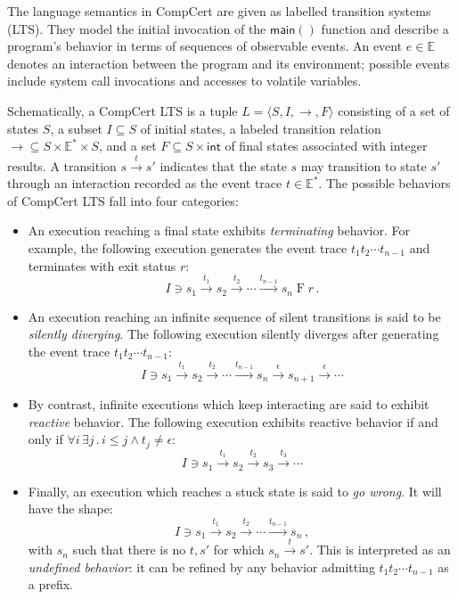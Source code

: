 \documentclass[sigplan,10pt,review,anonymous]{acmart}
\newcommand{\kw}[1]{\ensuremath{ \mathsf{#1} }}
\begin{document}
The language semantics in CompCert are
given as labelled transition systems (LTS).
They model the initial invocation of the \kw{main()} function
and describe a program's behavior in terms of
sequences of observable events.
An event $e \in \mathbb{E}$ denotes an interaction between
the program and its environment;
possible events include system call invocations
and accesses to volatile variables.

Schematically, a CompCert LTS
is a tuple
$L = \langle S, I, {\rightarrow}, F \rangle$
consisting of
a set of states $S$,
a subset $I \subseteq S$ of initial states,
a labeled transition relation
${\rightarrow} \subseteq S \times \mathbb{E}^* \times S$,
and a set
$F \subseteq S \times \kw{int}$
of final states associated with integer results.
A transition $s \stackrel{t}{\rightarrow} s'$
indicates that the state $s$ may transition to state $s'$
through an interaction recorded as the event trace $t \in \mathbb{E}^*$.
The possible behaviors of CompCert LTS fall into four categories:
\begin{itemize}
\item An execution reaching a final state exhibits
    \emph{terminating} behavior.
    For example,
    the following execution generates
    the event trace $t_1 t_2 \cdots t_{n-1}$
    and terminates with exit status $r$:
    \[
        I \ni s_1 \stackrel{t_1}{\rightarrow}
          s_2 \stackrel{t_2}{\rightarrow}
          \cdots \stackrel{t_{n-1}}{\rightarrow}
          s_n \mathrel{F} r \,.
    \]
\item An execution reaching
    an infinite sequence of silent transitions
    is said to be \emph{silently diverging}.
    The following execution silently diverges after
    generating the event trace $t_1 t_2 \cdots t_{n-1}$:
    \[
        I \ni s_1 \stackrel{t_1}{\rightarrow}
          s_2 \stackrel{t_2}{\rightarrow}
          \cdots \stackrel{t_{n-1}}{\rightarrow}
          s_n \stackrel{\epsilon}{\rightarrow}
          s_{n+1} \stackrel{\epsilon}{\rightarrow}
          \cdots
    \]
\item By contrast,
    infinite executions which keep interacting
    are said to exhibit \emph{reactive} behavior.
    The following execution
    exhibits reactive behavior if and only if
    $\forall i \, \exists j \,.\, i \le j \wedge t_j \ne \epsilon$:
    \[
        I \ni s_1 \stackrel{t_1}{\rightarrow}
          s_2 \stackrel{t_2}{\rightarrow}
          s_3 \stackrel{t_3}{\rightarrow}
          \cdots
    \]
\item Finally, an execution which reaches a stuck state
    is said to \emph{go wrong}. It will have the shape:
    \[
        I \ni s_1 \stackrel{t_1}{\rightarrow}
          s_2 \stackrel{t_2}{\rightarrow}
          \cdots \stackrel{t_{n-1}}{\rightarrow}
          s_n \,,
    \]
    with $s_n$ such that there is no $t, s'$ for which
    $s_n \stackrel{t}{\rightarrow} s'$.
    This is interpreted as an \emph{undefined behavior}:
    it can be refined by any behavior
    admitting $t_1 t_2 \cdots t_{n-1}$ as a prefix.
\end{itemize}
\end{document}
